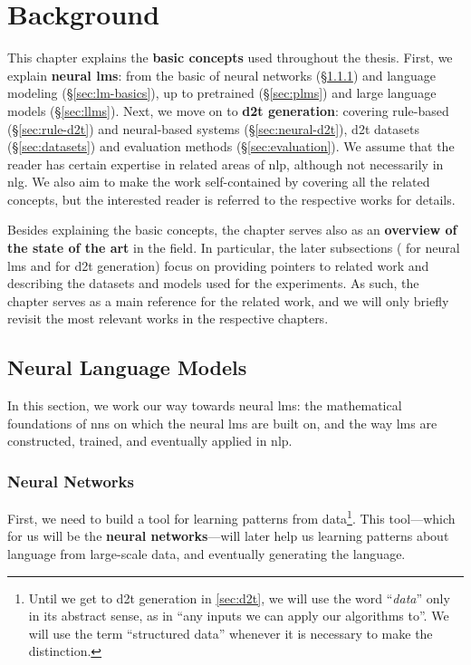 
\chapter{Background}
\label{chap:background}

This chapter explains the \textbf{basic concepts} used throughout the thesis. First, we explain \textbf{neural \acp{lm}}: from the basic of neural networks (§\ref{sec:nns}) and language modeling (§\ref{sec:lm-basics}), up to pretrained (§\ref{sec:plms}) and large language models (§\ref{sec:llms}). Next, we move on to \textbf{\ac{d2t} generation}: covering rule-based (§\ref{sec:rule-d2t}) and neural-based systems (§\ref{sec:neural-d2t}), \ac{d2t} datasets (§\ref{sec:datasets}) and evaluation methods (§\ref{sec:evaluation}). We assume that the reader has certain expertise in related areas of \ac{nlp}, although not necessarily in \ac{nlg}. We also aim to make the work self-contained by covering all the related concepts, but the interested reader is referred to the respective works for details.

Besides explaining the basic concepts, the chapter serves also as an \textbf{overview of the state of the art} in the field. In particular, the later subsections ( for neural \acp{lm} and  for \ac{d2t} generation) focus on providing pointers to related work and describing the datasets and models used for the experiments. As such, the chapter serves as a main reference for the related work, and we will only briefly revisit the most relevant works in the respective chapters.


\section{Neural Language Models}
\label{sec:lms}
In this section, we work our way towards neural \acp{lm}: the mathematical foundations of \acp{nn} on which the neural \acp{lm} are built on, and the way \acp{lm} are constructed, trained, and eventually applied in \ac{nlp}.

\subsection{Neural Networks}
\label{sec:nns}
First, we need to build a tool for learning patterns from data\footnote{Until we get to \ac{d2t} generation in \autoref{sec:d2t}, we will use the word ``\textit{data}'' only in its abstract sense, as in ``any inputs we can apply our algorithms to''. We will use the term ``structured data'' whenever it is necessary to make the distinction.}. This tool---which for us will be the \textbf{neural networks}---will later help us learning patterns about language from large-scale data, and eventually generating the language.

